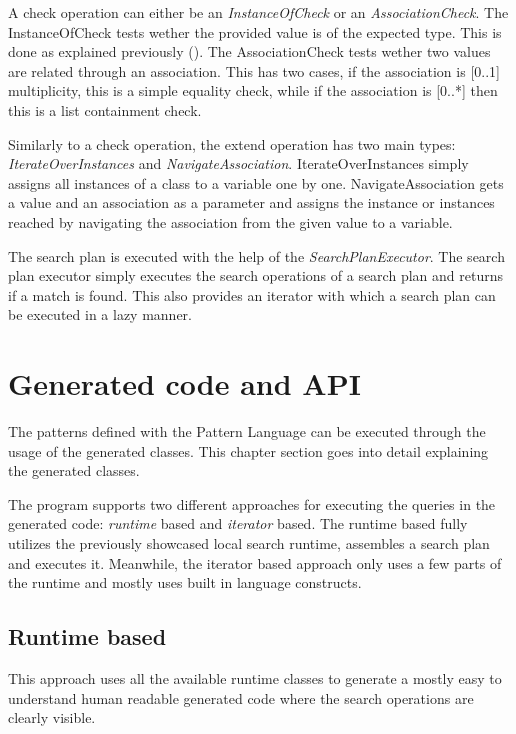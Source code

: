 A check operation can either be an \emph{InstanceOfCheck} or an
\emph{AssociationCheck}. The InstanceOfCheck tests wether the provided value is
of the expected type. This is done as explained previously
(). The AssociationCheck tests wether two values are
related through an association. This has two cases, if the association is [0..1]
multiplicity, this is a simple equality check, while if the association is
[0..*] then this is a list containment check.

Similarly to a check operation, the extend operation has two main types:
\emph{IterateOverInstances} and \emph{NavigateAssociation}. IterateOverInstances
simply assigns all instances of a class to a variable one by one.
NavigateAssociation gets a value and an association as a parameter and assigns
the instance or instances reached by navigating the association from the given
value to a variable.

The search plan is executed with the help of the \emph{SearchPlanExecutor}. The
search plan executor simply executes the search operations of a search plan and
returns if a match is found. This also provides an iterator with which a search
plan can be executed in a lazy manner.

\section{Generated code and API}\label{sect:generated_code_and_api}

The patterns defined with the \EIQ{} Pattern Language can be executed through
the usage of the generated classes. This chapter section goes into detail
explaining the generated classes.

The program supports two different approaches for executing the queries in the
generated code: \emph{runtime} based and \emph{iterator} based. The runtime
based fully utilizes the previously showcased local search runtime, assembles a
search plan and executes it. Meanwhile, the iterator based approach only uses a
few parts of the runtime and mostly uses built in language constructs.

\subsection{Runtime based}

This approach uses all the available runtime classes to generate a mostly easy
to understand human readable generated code where the search operations are
clearly visible. 

